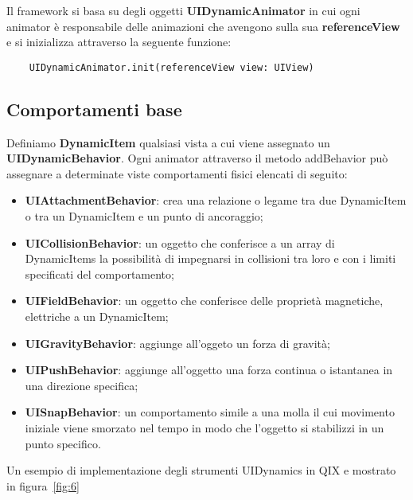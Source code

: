 Il framework si basa su degli oggetti \textbf{UIDynamicAnimator} in cui ogni animator è responsabile delle
animazioni che avengono sulla sua \textbf{referenceView} e si inizializza 
attraverso la seguente funzione:

\begin{verbatim}
    UIDynamicAnimator.init(referenceView view: UIView)
\end{verbatim}


\subsection{Comportamenti base}

Definiamo \textbf{DynamicItem} qualsiasi vista a cui viene assegnato un \textbf{UIDynamicBehavior}.
Ogni animator attraverso il metodo addBehavior può assegnare a determinate
viste comportamenti fisici elencati di seguito: 

\begin{itemize}
    \item\textbf{UIAttachmentBehavior}: crea una relazione o legame tra due DynamicItem o tra un DynamicItem e un punto di ancoraggio;
    \item\textbf{UICollisionBehavior}: un oggetto che conferisce a un array di DynamicItems la possibilità di impegnarsi in collisioni tra loro e con i limiti specificati del comportamento;
    \item\textbf{UIFieldBehavior}: un oggetto che conferisce delle proprietà magnetiche, elettriche a un DynamicItem;
    \item\textbf{UIGravityBehavior}: aggiunge all'oggeto un forza di gravità;
    \item\textbf{UIPushBehavior}: aggiunge all'oggetto una forza continua o istantanea in una direzione specifica;
    \item\textbf{UISnapBehavior}: un comportamento simile a una molla il cui movimento iniziale viene smorzato nel tempo in modo che l'oggetto si stabilizzi in un punto specifico.
\end{itemize}

Un esempio di implementazione degli strumenti UIDynamics in QIX e mostrato in figura~\ref{fig:6}

